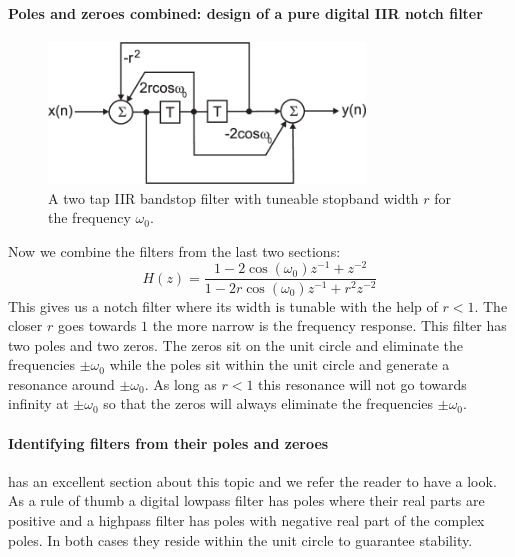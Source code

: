 \documentclass[12pt,a4paper]{article}
\begin{document}
\paragraph{Poles and zeroes combined: design of a pure digital IIR notch filter}
\begin{figure}[!hbt]
\begin{center}
\mbox{\includegraphics[width=0.75\textwidth]{iir_fir_stop}}
\end{center}
\caption{A two tap IIR bandstop filter with tuneable stopband width $r$
for the frequency $\omega_0$.
\label{iir_fir_stop}}
\end{figure}
Now we combine the filters from the last two sections:
\begin{equation} 
H(z) = \frac {1 - 2 \cos (\omega_{0}) z^{-1} + z^{-2}}{1 - 2r \cos (\omega_{0}) z^{-1} + r^{2} z^{-2}} 
\end{equation}
This gives us a notch filter where its width is tunable with the
help of $r<1$. The closer $r$ goes towards $1$ the more narrow
is the frequency response.
This filter has two poles and two zeros. The zeros sit on the unit
circle and eliminate the frequencies $\pm\omega_0$ while the
poles sit within the unit circle and generate a resonance around
$\pm\omega_0$. As long as $r<1$ this resonance will not go towards
infinity at $\pm\omega_0$ so that the zeros will always eliminate
the frequencies $\pm\omega_0$.

\paragraph{Identifying filters from their poles and zeroes}
\citet[pp.333]{Proakis1996} has an excellent section about this topic
and we refer the reader to have a look. As a rule of thumb a digital
lowpass filter has poles where their real parts are positive and a
highpass filter has poles with negative real part of the complex
poles. In both cases they reside within the unit circle to guarantee
stability.





\end{document}
